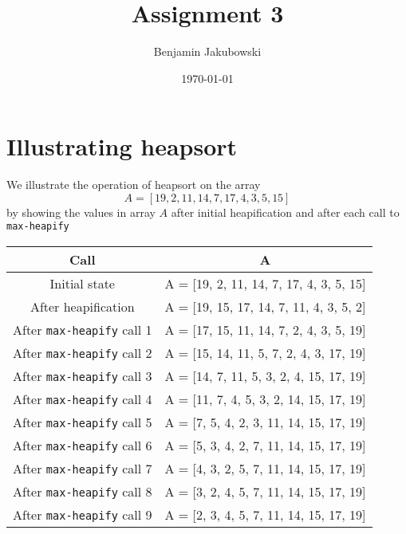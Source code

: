 \documentclass[paper=a4, fontsize=11pt]{scrartcl} %
\title{	Assignment 3}
\author{Benjamin Jakubowski} %
\date{\normalsize\today} %
\numberwithin{equation}{section} %
\numberwithin{figure}{section} %
\numberwithin{table}{section} %
\begin{document}
\maketitle %

\section{Illustrating heapsort}

We illustrate the operation of heapsort on the array
\[A = [19, 2, 11, 14, 7, 17, 4, 3, 5, 15]\]
by showing the values in array $A$ after initial heapification and after each call to \texttt{max-heapify}

\begin{center}
\begin{tabular}{| c | c |}
\hline
\textbf{Call} & \textbf{A} \\
\hline
Initial state & A = [19, 2, 11, 14, 7, 17, 4, 3, 5, 15]\\
\hline
After heapification & A =  [19, 15, 17, 14, 7, 11, 4, 3, 5, 2] \\
\hline
After \texttt{max-heapify} call 1 & A = [17, 15, 11, 14, 7, 2, 4, 3, 5, 19] \\
\hline
After \texttt{max-heapify} call 2 & A = [15, 14, 11, 5, 7, 2, 4, 3, 17, 19] \\
\hline
After \texttt{max-heapify} call 3 & A = [14, 7, 11, 5, 3, 2, 4, 15, 17, 19] \\
\hline
After \texttt{max-heapify} call 4 & A = [11, 7, 4, 5, 3, 2, 14, 15, 17, 19] \\
\hline
After \texttt{max-heapify} call 5 & A = [7, 5, 4, 2, 3, 11, 14, 15, 17, 19] \\
\hline
After \texttt{max-heapify} call 6 & A = [5, 3, 4, 2, 7, 11, 14, 15, 17, 19] \\
\hline
After \texttt{max-heapify} call 7 & A = [4, 3, 2, 5, 7, 11, 14, 15, 17, 19] \\
\hline
After \texttt{max-heapify} call 8 & A = [3, 2, 4, 5, 7, 11, 14, 15, 17, 19] \\
\hline
After \texttt{max-heapify} call 9 & A = [2, 3, 4, 5, 7, 11, 14, 15, 17, 19] \\
\hline
\end{tabular}
\end{center}
\end{document}
